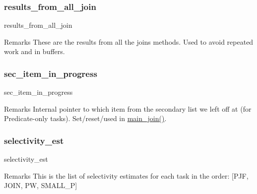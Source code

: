 \subsubsection{\texorpdfstring{results\_from\_all\_join}{results\_from\_all\_join}}
{\footnotesize\ttfamily results\+\_\+from\+\_\+all\+\_\+join}

\begin{DoxyRemark}{Remarks}
These are the results from all the joins methods. Used to avoid repeated work and in buffers. 
\end{DoxyRemark}
\mbox{\label{classdynamicfilterapp_1_1models_1_1_join_a7b60c5a3450732ea72b3cfee8f87449d}} 
\subsubsection{\texorpdfstring{sec\_item\_in\_progress}{sec\_item\_in\_progress}}
{\footnotesize\ttfamily sec\+\_\+item\+\_\+in\+\_\+progress}

\begin{DoxyRemark}{Remarks}
Internal pointer to which item from the secondary list we left off at (for Predicate-\/only tasks). Set/reset/used in \mbox{\hyperlink{classdynamicfilterapp_1_1models_1_1_join_a62960f85abfb27dc5e3623c4790c6e70}{main\+\_\+join()}}. 
\end{DoxyRemark}
\mbox{\label{classdynamicfilterapp_1_1models_1_1_join_a69583dd8724a5380d6c68ce2edffe2d6}} 
\subsubsection{\texorpdfstring{selectivity\_est}{selectivity\_est}}
{\footnotesize\ttfamily selectivity\+\_\+est}

\begin{DoxyRemark}{Remarks}
This is the list of selectivity estimates for each task in the order\+: \mbox{[}P\+JF, J\+O\+IN, PW, S\+M\+A\+L\+L\+\_\+P\mbox{]} 
\end{DoxyRemark}
\mbox{\label{classdynamicfilterapp_1_1models_1_1_join_a17c32d7a1280b5817ac92be68a5f30cd}} 
